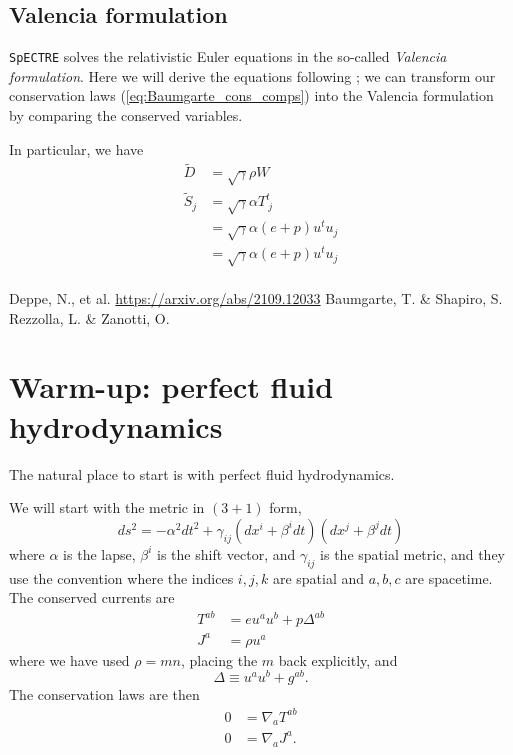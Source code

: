 \documentclass[12pt]{article}
\numberwithin{equation}{section}
\begin{document}
\subsection{Valencia formulation}

{\tt SpECTRE} solves the relativistic Euler equations in the so-called \textit{Valencia formulation}.
Here we will derive the equations following \cite{RezzollaZanotti}; we can transform our conservation laws (\ref{eq:Baumgarte_cons_comps}) into the Valencia formulation by comparing the conserved variables.

In particular, we have
\begin{equation}
\begin{aligned}
\tilde{D} &= \sqrt{\gamma} \rho W \\
\tilde{S}_j &= \sqrt{\gamma} \alpha T^{t}_{~j} \\
&= \sqrt{\gamma} \alpha (e + p) u^t u_j \\
&= \sqrt{\gamma} \alpha (e + p) u^t u_j \\
\end{aligned}
\end{equation}


\clearpage

\begin{thebibliography}{10}
 Deppe, N., et al. \url{https://arxiv.org/abs/2109.12033}
 Baumgarte, T. \& Shapiro, S.
 Rezzolla, L. \& Zanotti, O.
\end{thebibliography}

\appendix

\clearpage

\section{Warm-up: perfect fluid hydrodynamics}

The natural place to start is with perfect fluid hydrodynamics.

We will start with the metric in $(3+1)$ form,
\begin{equation}
ds^2 = - \alpha^2 dt^2 + \gamma_{ij} (dx^i + \beta^i dt) (dx^j + \beta^j dt)
\end{equation}
where $\alpha$ is the lapse, $\beta^{i}$ is the shift vector, and $\gamma_{ij}$
is the spatial metric, and they use the convention where the indices $i,j,k$
are spatial and $a,b,c$ are spacetime.
The conserved currents are
\begin{align}
T^{ab} &= e u^a u^b + p \Delta^{ab} \\
J^{a} &= \rho u^a
\end{align}
where we have used $\rho = m n$, placing the $m$ back explicitly, and
\begin{equation}
\Delta \equiv u^a u^b + g^{ab}.
\end{equation}
The conservation laws are then
\begin{align}
0 &= \nabla_{a} T^{ab} \\
0 &= \nabla_{a} J^{a}.
\end{align}
\end{document}
